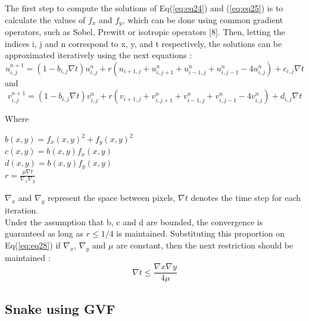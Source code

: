 \hspace{-0.6cm}The first step to compute the solutions of Eq(\ref{eq:eq24}) and (\ref{eq:eq25}) is to calculate
the values of $f_x$ and $f_y$, which can be done using common gradient operators,
such as Sobel, Prewitt or isotropic operators [8]. Then, letting the indices i, j
and n correspond to x, y, and t respectively, the solutions can be approximated
iteratively using the next equations \cite{2.9}:
\begin{equation}
        u_{i,j}^{n+1} = (1- b_{i,j} \nabla t)u_{i,j}^n + r(u_{i+1,j} + u_{i,j+1}^n + u_{i-1,j}^n + u_{i,j-1}^n - 4 u_{i,j}^n ) + c_{i,j} \nabla t
        \label{eq:eq26}
\end{equation}
and
\begin{equation}
        v_{i,j}^{n+1} = (1- b_{i,j} \nabla t)v_{i,j}^n + r(v_{i+1,j} + v_{i,j+1}^n + v_{i-1,j}^n + v_{i,j-1}^n - 4 v_{i,j}^n ) + d_{i,j} \nabla t
        \label{eq:eq27}
\end{equation}

Where
\begin{center}
        $b(x, y) = f_{x}(x, y)^{2} + f_{y}(x, y)^{2} $ \\
        $c(x, y) = b(x, y)f_{x}(x, y)$ \\
        $d(x, y) = b(x, y)f_{y}(x, y)$ \\
        $r = \frac{\mu \nabla t}{\nabla_{x}\nabla_{y}}$
\end{center}

\hspace{-0.6cm}$\nabla_{x}$ and $\nabla_{y}$ represent the space between pixels, $\nabla t$ denotes the time step for
each iteration. \\
Under the assumption that b, c and d are bounded, the convergence is
guaranteed as long as $r\leq1/4$ is maintained. Substituting this proportion on Eq(\ref{eq:eq28})
if $\nabla_{x}$, $\nabla_{y}$ and $\mu$ are constant, then the next restriction should be maintained \cite{2.9}:
\begin{equation}
        \nabla t \leq \frac{\nabla x \nabla y}{4 \mu}
        \label{eq:eq28}
\end{equation}

\subsection{Snake using GVF}\label{subsec:snake-using-gvf}

